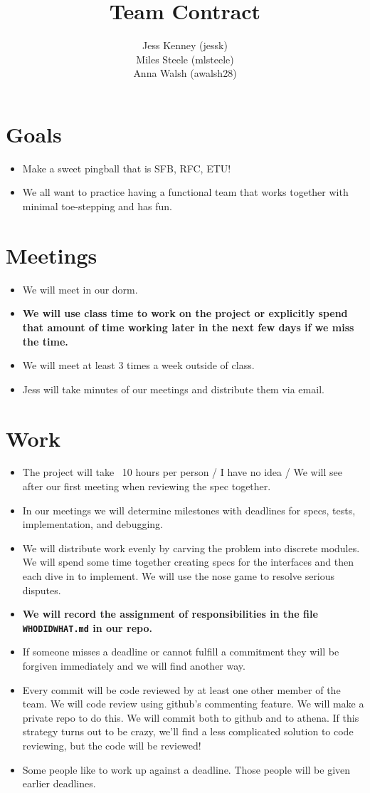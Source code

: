 \documentclass{article}
\title{Team Contract}
\author{Jess Kenney (jessk)\\Miles Steele (mlsteele)\\Anna Walsh (awalsh28)}
\begin{document}
\maketitle
\section{Goals}
\begin{itemize}
\item Make a sweet pingball that is SFB, RFC, ETU!
\item We all want to practice having a functional team that works together with minimal toe-stepping and has fun.
\end{itemize}

\section{Meetings}
\begin{itemize}
\item We will meet in our dorm.
\item \textbf{We will use class time to work on the project or explicitly spend that amount of time working later in the next few days if we miss the time.}
\item We will meet at least 3 times a week outside of class.
\item Jess will take minutes of our meetings and distribute them via email.
\end{itemize}

\section{Work}
\begin{itemize}
\item The project will take ~10 hours per person / I have no idea / We will see after our first meeting when reviewing the spec together.
\item In our meetings we will determine milestones with deadlines for specs, tests, implementation, and debugging.
\item We will distribute work evenly by carving the problem into discrete modules. We will spend some time together creating specs for the interfaces and then each dive in to implement. We will use the nose game to resolve serious disputes.
\item \textbf{We will record the assignment of responsibilities in the file \texttt{WHODIDWHAT.md} in our repo.}
\item If someone misses a deadline or cannot fulfill a commitment they will be forgiven immediately and we will find another way.
\item Every commit will be code reviewed by at least one other member of the team. We will code review using github's commenting feature. We will make a private repo to do this. We will commit both to github and to athena. If this strategy turns out to be crazy, we'll find a less complicated solution to code reviewing, but the code will be reviewed!
\item Some people like to work up against a deadline. Those people will be given earlier deadlines.
\end{itemize}
\end{document}
